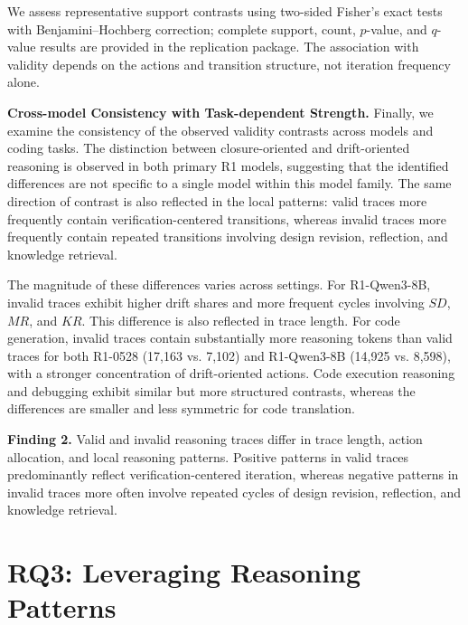 \documentclass[acmsmall,screen,review,anonymous]{acmart}
\begin{document}
We assess representative support contrasts using two-sided Fisher's exact tests with Benjamini--Hochberg correction; complete support, count, \(p\)-value, and \(q\)-value results are provided in the replication package. The association with validity depends on the actions and transition structure, not iteration frequency alone.

\textbf{Cross-model Consistency with Task-dependent Strength.}
Finally, we examine the consistency of the observed validity contrasts across models and coding tasks. The distinction between closure-oriented and drift-oriented reasoning is observed in both primary R1 models, suggesting that the identified differences are not specific to a single model within this model family. The same direction of contrast is also reflected in the local patterns: valid traces more frequently contain verification-centered transitions, whereas invalid traces more frequently contain repeated transitions involving design revision, reflection, and knowledge retrieval.

The magnitude of these differences varies across settings. For R1-Qwen3-8B, invalid traces exhibit higher drift shares and more frequent cycles involving \(SD\), \(MR\), and \(KR\). This difference is also reflected in trace length. For code generation, invalid traces contain substantially more reasoning tokens than valid traces for both R1-0528 (17,163 vs. 7,102) and R1-Qwen3-8B (14,925 vs. 8,598), with a stronger concentration of drift-oriented actions. Code execution reasoning and debugging exhibit similar but more structured contrasts, whereas the differences are smaller and less symmetric for code translation.


\begin{tcolorbox}[width=\linewidth, boxrule=0.8pt, left=2pt, right=2pt, top=2pt, bottom=2pt, colback=gray!10, colframe=black]
\textbf{Finding 2.}
Valid and invalid reasoning traces differ in trace length, action allocation, and local reasoning patterns. Positive patterns in valid traces predominantly reflect verification-centered iteration, whereas negative patterns in invalid traces more often involve repeated cycles of design revision, reflection, and knowledge retrieval.
\end{tcolorbox}

\section{RQ3: Leveraging Reasoning Patterns}
\label{sec:rq3}
\end{document}
